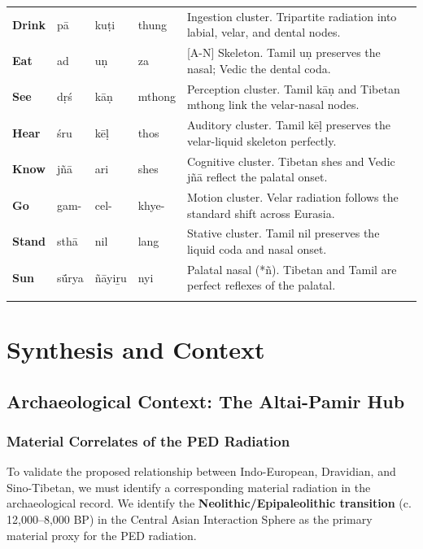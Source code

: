 \documentclass[11pt,oneside,openany]{book}
\begin{document}
\begin{longtable}{p{} p{} p{} p{} p{}}
\textbf{Drink} & pā & kuṭi & thung & \small Ingestion cluster. Tripartite radiation into labial, velar, and dental nodes. \\ 
\addlinespace[10pt]

\textbf{Eat} & ad & uṇ & za & \small [A-N] Skeleton. Tamil uṇ preserves the nasal; Vedic the dental coda. \\ 
\addlinespace[10pt]

\textbf{See} & dṛś & kāṇ & mthong & \small Perception cluster. Tamil kāṇ and Tibetan mthong link the velar-nasal nodes. \\ 
\addlinespace[10pt]

\textbf{Hear} & śru & kēḷ & thos & \small Auditory cluster. Tamil kēḷ preserves the velar-liquid skeleton perfectly. \\ 
\addlinespace[10pt]

\textbf{Know} & jñā & ari & shes & \small Cognitive cluster. Tibetan shes and Vedic jñā reflect the palatal onset. \\ 
\addlinespace[10pt]

\textbf{Go} & gam- & cel- & khye- & \small Motion cluster. Velar radiation follows the standard shift across Eurasia. \\ 
\addlinespace[10pt]

\textbf{Stand} & sthā & nil & lang & \small Stative cluster. Tamil nil preserves the liquid coda and nasal onset. \\ 
\addlinespace[10pt]

\textbf{Sun} & sū́rya & ñāyiṟu & nyi & \small Palatal nasal (*ñ). Tibetan and Tamil are perfect reflexes of the palatal. \\ 
\addlinespace[10pt]

\end{longtable}



\part{Synthesis and Context}
\chapter{Archaeological Context: The Altai-Pamir Hub}

\section{Material Correlates of the PED Radiation}
To validate the proposed relationship between Indo-European, Dravidian, and Sino-Tibetan, we must identify a corresponding material radiation in the archaeological record. We identify the \textbf{Neolithic/Epipaleolithic transition} (c. 12,000--8,000 BP) in the Central Asian Interaction Sphere as the primary material proxy for the PED radiation.
\end{document}
